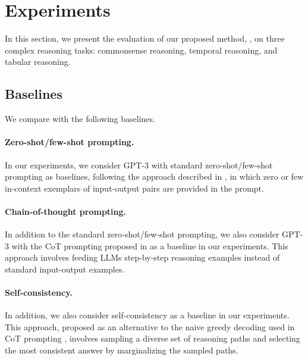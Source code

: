 
\section{Experiments}
\label{sec:experiments}
In this section, we present the evaluation of our proposed method, \NAME{}, on three complex reasoning tasks: commonsense reasoning, temporal reasoning, and tabular reasoning. 

\subsection{Baselines}
\label{subsec:baselines}
We compare with the following baselines.

\paragraph{Zero-shot/few-shot prompting.} In our experiments, we consider GPT-3 with standard zero-shot/few-shot prompting as baselines, following the approach described in \citet{brown2020language}, in which zero or few in-context exemplars of input-output pairs are provided in the prompt.

\paragraph{Chain-of-thought prompting.} In addition to the standard zero-shot/few-shot prompting, we also consider GPT-3 with the CoT prompting proposed in \cite{wei2022chain} as a baseline in our experiments. This approach involves feeding LLMs step-by-step reasoning examples instead of standard input-output examples.

\paragraph{Self-consistency.} In addition, we also consider self-consistency \cite{wang2022self} as a baseline in our experiments. This approach, proposed as an alternative to the naive greedy decoding used in CoT prompting \cite{wei2022chain}, involves sampling a diverse set of reasoning paths and selecting the most consistent answer by marginalizing the sampled paths. 

